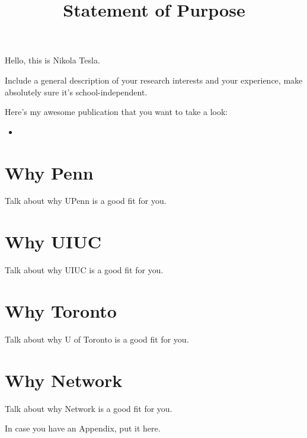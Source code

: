 \documentclass{article}
\begin{document}
\title{Statement of Purpose}
\maketitle

Hello, this is Nikola Tesla.

Include a general description of your research interests and your experience,
make absolutely sure it's school-independent.

Here's my awesome publication that you want to take a look:
\begin{itemize}
  \item {}
\end{itemize}

\ifdefined{}
\section*{Why Penn}
Talk about why UPenn is a good fit for you.
\fi

\ifdefined{}
\section*{Why UIUC}
Talk about why UIUC is a good fit for you.
\fi

\ifdefined{}
\section*{Why Toronto}
Talk about why U of Toronto is a good fit for you.
\fi

\ifdefined{}
\section*{Why Network}
Talk about why Network is a good fit for you.
\fi

\newpage
\printbibliography
\appendix
In case you have an Appendix, put it here.
\end{document}
